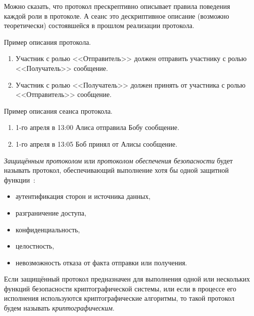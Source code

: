 Можно сказать, что протокол прескрептивно описывает правила поведения каждой роли в протоколе. А сеанс это дескриптивное описание (возможно теоретически) состоявшейся в прошлом реализации протокола.

Пример описания протокола.
\begin{enumerate}
	\item Участник с ролью <<Отправитель>> должен отправить участнику с ролью <<Получатель>> сообщение.
	\item Участник с ролью <<Получатель>> должен принять от участника с ролью <<Отправитель>> сообщение.
\end{enumerate}

Пример описания сеанса протокола.
\begin{enumerate}
	\item 1-го апреля в 13:00 Алиса отправила Бобу сообщение.
	\item 1-го апреля в 13:05 Боб принял от Алисы сообщение.
\end{enumerate}

\emph{Защищённым протоколом} или \emph{протоколом обеспечения безопасности} будет называть протокол, обеспечивающий выполнение хотя бы одной защитной функции~\cite{ISO:7498-2:1989}:
\begin{itemize}
	\item аутентификация сторон и источника данных,
	\item разграничение доступа,
	\item конфиденциальность,
	\item целостность,
	\item невозможность отказа от факта отправки или получения.
\end{itemize}

Если защищённый протокол предназначен для выполнения одной или нескольких функций безопасности криптографической системы, или если в процессе его исполнения используются криптографические алгоритмы, то такой протокол будем называть \emph{криптографическим}.
